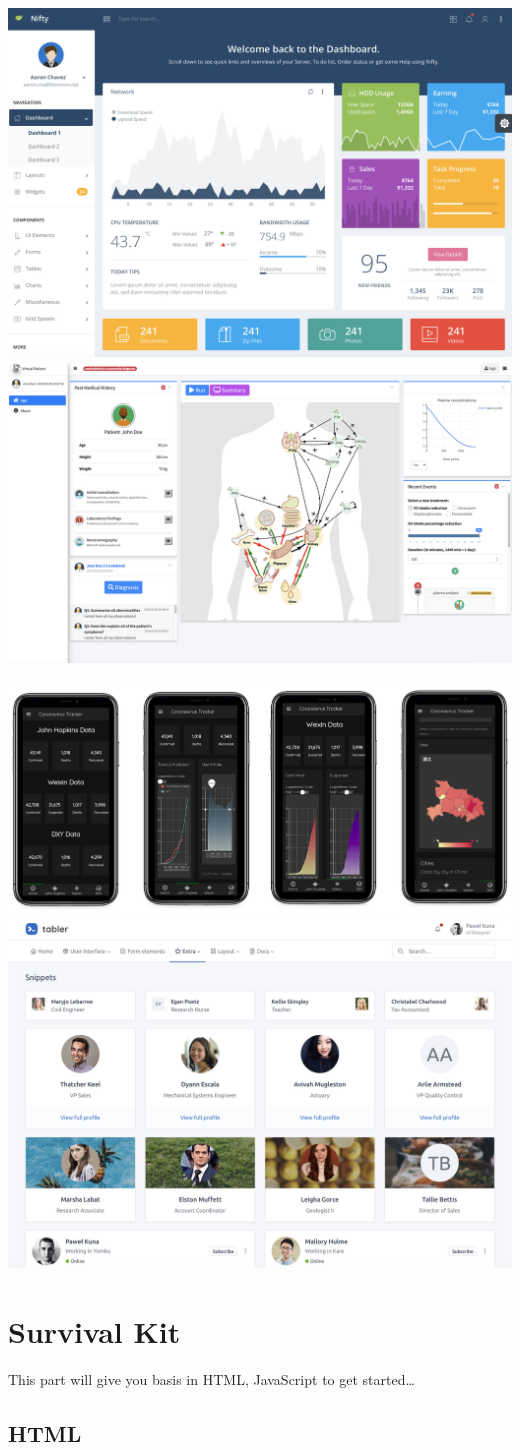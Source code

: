 \documentclass[]{book}
\begin{document}
\includegraphics[width=0.5\linewidth]{images/intro/nifty} \includegraphics[width=0.5\linewidth]{images/intro/virtual_patient}

\includegraphics[width=0.5\linewidth]{images/intro/covid-tracker} \includegraphics[width=0.5\linewidth]{images/intro/tabler}

\hypertarget{part-survival-kit}{%
\part*{Survival Kit}\label{part-survival-kit}}

This part will give you basis in HTML, JavaScript to get started\ldots{}

\hypertarget{survival-kit-html}{%
\chapter{HTML}\label{survival-kit-html}}
\end{document}
